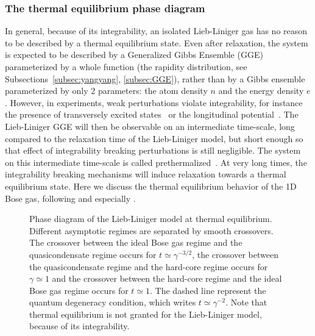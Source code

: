 \documentclass[onecolumn,amsfonts,showpacs,superscriptaddress]{revtex4-1}
\begin{document}
\subsubsection{The thermal equilibrium phase diagram} In general, because of its integrability, an isolated Lieb-Liniger gas has
no reason to be described by a thermal equilibrium state.
Even after relaxation, the system is expected to be described by a Generalized Gibbs Ensemble (GGE) parameterized by a whole function (the rapidity distribution, see Subsections~\ref{subsec:yangyang}, \ref{subsec:GGE}), rather than by a Gibbs ensemble parameterized by only 2 parameters: the atom density $n$ and the energy density $e$. 
However, in experiments, weak
perturbations violate integrability, for instance the
presence of transversely excited states~\citep{li_relaxation_2020,mazets_breakdown_2008}
or the longitudinal
potential~\citep{bastianello_thermalization_2020}. 
The Lieb-Liniger GGE will then be observable on an intermediate time-scale, long compared to the relaxation time of the Lieb-Liniger model, but short enough so that 
effect of integrability breaking perturbations is still
negligible. The system on this intermediate time-scale 
is called prethermalized~\citep{berges_prethermalization_2004}.
At very long times, the integrability breaking mechanisms will induce relaxation towards a thermal equilibrium state. Here we discuss the thermal equilibrium behavior of the 1D Bose gas, following \citep{petrov_regimes_2000,gangardt2003local} and especially \citep{kheruntsyan2003pair}.



\begin{figure}
  \centerline{ \scalebox{0.8}{}}
  \caption{Phase diagram of the Lieb-Liniger model at thermal equilibrium.
    Different asymptotic regimes are separated by smooth crossovers.
    The crossover between the ideal Bose gas regime and the quasicondensate
    regime occurs for $t\simeq \gamma^{-3/2}$, the crossover
    between the quasicondensate regime and the hard-core regime
    occurs for $\gamma \simeq 1$ and the crossover between the
    hard-core regime and the ideal Bose gas regime occurs
    for $t\simeq 1$. The dashed line represent the quantum
    degeneracy condition, which writes $t\simeq \gamma^{-2}$.
    Note that thermal equilibrium is not granted for the Lieb-Liniger model, because of its integrability.}
    \label{fig:phase_diagram}
\end{figure}
\end{document}
